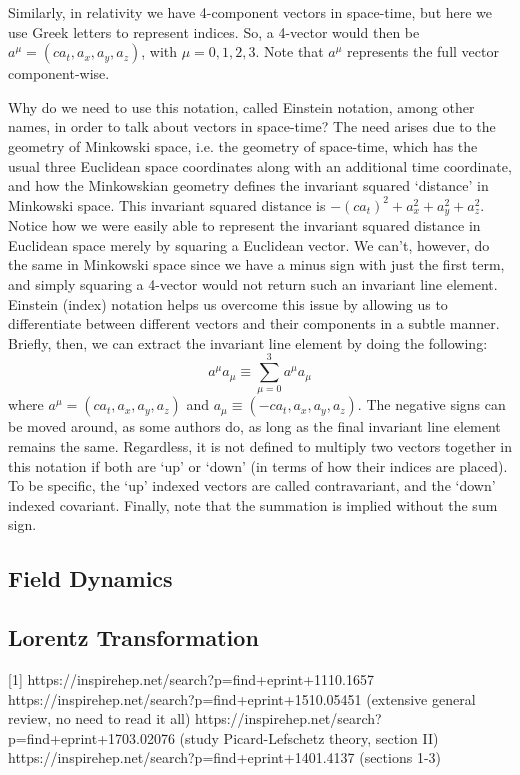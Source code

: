 \documentclass{emulateapj}
\begin{document}
Similarly, in relativity we have 4-component vectors in space-time, but here we use Greek letters to represent indices. So, a 4-vector would then be $a^\mu=(ca_t,a_x,a_y,a_z)$, with $\mu=0,1,2,3$. Note that $a^\mu$ represents the full vector component-wise. 

Why do we need to use this notation, called Einstein notation, among other names, in order to talk about vectors in space-time? The need arises due to the geometry of Minkowski space, i.e. the geometry of space-time, which has the usual three Euclidean space coordinates along with an additional time coordinate, and how the Minkowskian geometry defines the invariant squared `distance' in Minkowski space. This invariant squared distance is $-(ca_t)^2+a_x^2+a_y^2+a_z^2$. Notice how we were easily able to represent the invariant squared distance in Euclidean space merely by squaring a Euclidean vector. We can't, however, do the same in Minkowski space since we have a minus sign with just the first term, and simply squaring a 4-vector would not return such an invariant line element. Einstein (index) notation helps us overcome this issue by allowing us to differentiate between different vectors and their components in a subtle manner. Briefly, then, we can extract the invariant line element by doing the following:
\[ a^\mu a_\mu \equiv \sum_{\mu=0}^{3} a^\mu a_\mu\]
where $a^\mu=(ca_t,a_x,a_y,a_z)$ and $a_\mu\equiv(-ca_t,a_x,a_y,a_z)$. The negative signs can be moved around, as some authors do, as long as the final invariant line element remains the same. Regardless, it is not defined to multiply two vectors together in this notation if both are `up' or `down' (in terms of how their indices are placed). To be specific, the `up' indexed vectors are called contravariant, and the `down' indexed covariant. Finally, note that the summation is implied without the sum sign.

\subsection{Field Dynamics} \label{field}

\subsection{Lorentz Transformation} \label{lorentz}



\begin{thebibliography}{}

[1] https://inspirehep.net/search?p=find+eprint+1110.1657 \newline
[2] https://inspirehep.net/search?p=find+eprint+1510.05451  (extensive general review, no need to read it all) \newline
[3] https://inspirehep.net/search?p=find+eprint+1703.02076   (study Picard-Lefschetz theory, section II) \newline
[4] https://inspirehep.net/search?p=find+eprint+1401.4137   (sections 1-3) 

\end{thebibliography}
\end{document}
